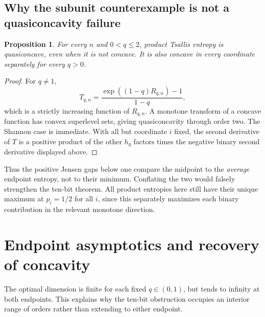 \documentclass[11pt]{article}
\numberwithin{equation}{section}
\newtheorem{proposition}[theorem]{Proposition}
\theoremstyle{definition}
\theoremstyle{remark}
\begin{document}
\subsection{Why the subunit counterexample is not a quasiconcavity failure}
\begin{proposition}\label{bep:pe:prop:quasiconcavity}
For every $n$ and $0<q\leq2$, product Tsallis entropy is quasiconcave,
even when it is not concave. It is also concave in every coordinate
separately for every $q>0$.
\end{proposition}
\begin{proof}
For $q\ne1$,
\begin{equation}
 T_{q,n}=\frac{\exp((1-q)R_{q,n})-1}{1-q},
\end{equation}
which is a strictly increasing function of $R_{q,n}$. A monotone
transform of a concave function has convex superlevel sets, giving
quasiconcavity through order two. The Shannon case is immediate.
With all but coordinate $i$ fixed, the second derivative of $T$ is a
positive product of the other $h_q$ factors times the negative binary
second derivative displayed above.
\end{proof}
Thus the positive Jensen gaps below one compare the midpoint to the
\emph{average} endpoint entropy, not to their minimum. Conflating the
two would falsely strengthen the ten-bit theorem. All product entropies
here still have their unique maximum at $p_i=1/2$ for all $i$, since
this separately maximizes each binary contribution in the relevant
monotone direction.

\section{Endpoint asymptotics and recovery of concavity}\label{bep:pe:sec:endpoints}
The optimal dimension is finite for each fixed $q\in(0,1)$, but tends
to infinity at both endpoints. This explains why the ten-bit obstruction
occupies an interior range of orders rather than extending to either
endpoint.
\end{document}
